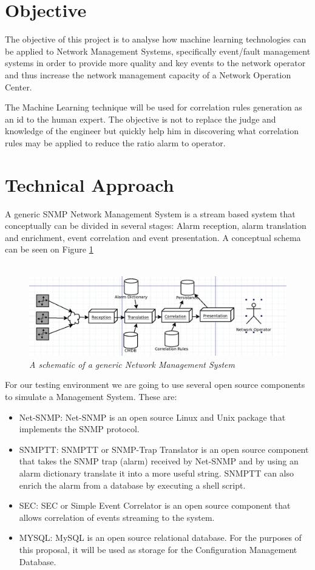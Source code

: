 \documentclass[10pt,a4paper]{article}
\begin{document}
 \section{Objective}
The objective of this project is to analyse how machine learning technologies can be applied to Network Management Systems, specifically event/fault management systems in order to provide more quality and key events to the network operator and thus increase the network management capacity of a Network Operation Center.

The Machine Learning technique will be used for correlation rules generation as an id to the human expert. The objective is not to replace the judge and knowledge of the engineer but quickly help him in discovering what correlation rules may be applied to reduce the ratio alarm to operator.
 
  \section{Technical Approach}
A generic SNMP Network Management System is a stream based system that conceptually can be divided in several stages: Alarm reception, alarm translation and enrichment, event correlation and event presentation. A conceptual schema can be seen on Figure \ref{fig:nms_generaldiagram}
\\\
\begin{figure}[H]
 \includegraphics[scale=0.4]{NMS_GeneralDiagram.png}
  \centering
  \caption{\textit{A schematic of a generic Network Management System}}
  \label{fig:nms_generaldiagram}
\end{figure}	

For our testing environment we are going to use several open source components to simulate a Management System. These are:

\begin{itemize}
  \item Net-SNMP: Net-SNMP is an open source Linux and Unix package that implements the SNMP protocol.\cite{netsnmp}
  \item SNMPTT: SNMPTT or SNMP-Trap Translator is an open source component that takes the SNMP trap (alarm) received by Net-SNMP and by using an alarm dictionary translate it into a more useful string. SNMPTT can also enrich the alarm from a database by executing a shell script.\cite{snmptt}
  \item SEC: SEC or Simple Event Correlator is an open source component that allows correlation of events streaming to the system.\cite{sec}
  \item MYSQL: MySQL is an open source relational database. For the purposes of this proposal, it will be used as storage for the Configuration Management Database.
\end{itemize}
\end{document}
